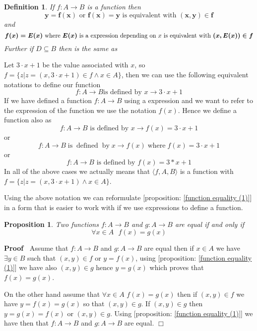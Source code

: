 \documentclass{book}
\newcommand{\tmmathbf}[1]{\ensuremath{\boldsymbol{#1}}}
\newcommand{\tmop}[1]{\ensuremath{\operatorname{#1}}}
\newcommand{\tmtextbf}[1]{\text{{\bfseries{#1}}}}
\newenvironment{proof}{\noindent\textbf{Proof\ }}{\hspace*{\fill}$\Box$\medskip}
\newtheorem{definition}{Definition}
{\theorembodyfont{\rmfamily}\newtheorem{example}{Example}}
\newtheorem{proposition}{Proposition}
{\theorembodyfont{\rmfamily}\newtheorem{remark}{Remark}}
\begin{document}
\begin{definition}
  \label{function f(x)}If $f : A \rightarrow B$ is a function then
  \[ \tmmathbf{y = f (x)} \text{ or $\tmmathbf{f (x) = y}$ is equivalent with
     } \tmmathbf{(x, y) \in f} \]
  and
  \[ \tmmathbf{f (x) = E (x)} \text{ where $\tmmathbf{E (x)} \text{ is a
     expression depending on \tmtextbf{$x$} is equivalent with } \tmmathbf{(x,
     E (x)) \in f}$} \]
  Further if $D \subseteq B$ then \tmtextbf{$\tmmathbf{f (x) \in D}$} is the
  same as \tmtextbf{$\exists y \in D$ such that $y = f (x)$ or $(x, y) \in f$}
\end{definition}

\begin{example}
  Let $3 \cdot x + 1$ be the value associated with $x$, so $f = \{ z|z = (x, 3
  \cdot x + 1) \in f \wedge x \in A \}$, then we can use the following
  equivalent notations to define our function
  \[ f : A \rightarrow B \text{is defined by } x \rightarrow 3 \cdot x + 1 \]
  If we have defined a function $f : A \rightarrow B$ using a expression and
  we want to refer to the expression of the function we use the notation $f
  (x)$. Hence we define a function also as
  \[ f : A \rightarrow B \text{ is defined by } x \rightarrow f (x) = 3 \cdot
     x + 1 \]
  or
  \[ f : A \rightarrow B \tmop{is} \tmop{defined} \tmop{by} x \rightarrow f
     (x) \tmop{where} f (x) = 3 \cdot x + 1 \]
  or
  \[ f : A \rightarrow B \text{ is defined by } f (x) = 3 \ast x + 1 \]
  In all of the above cases we actually means that $\langle f, A, B \rangle$
  is a function with $f = \{ z|z = (x, 3 \cdot x + 1) \wedge x \in A \}$.
\end{example}

Using the above notation we can reformulate [proposition: \ref{function
equality (1)}] in a form that is easier to work with if we use expressions to
define a function.

\begin{proposition}
  \label{function equality (2)}Two functions $f : A \rightarrow B$ and $g : A
  \rightarrow B$ are equal if and only if
  \[ \forall x \in A \text{ } f (x) = g (x) \]
\end{proposition}

\begin{proof}
  Assume that $f : A \rightarrow B$ and $g : A \rightarrow B$ are equal then
  if $x \in A$ we have $\exists y \in B$ such that $(x, y) \in f$ or $y = f
  (x)$, using [proposition: \ref{function equality (1)}] we have also $(x, y)
  \in g$ hence $y = g (x)$ which proves that $f (x) = g (x)$.
  
  On the other hand assume that $\forall x \in A$ $f (x) = g (x)$ then if
  $(x, y) \in f$ we have $y = f (x) = g (x)$ so that $(x, y) \in g$. If $(x,
  y) \in g$ then $y = g (x) = f (x)$ or $(x, y) \in g$. Using [proposition:
  \ref{function equality (1)}] we have then that $f : A \rightarrow B$ and $g
  : A \rightarrow B$ are equal.
\end{proof}
\end{document}
